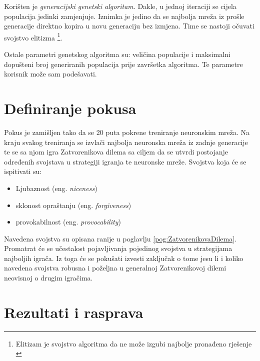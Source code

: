 \documentclass[zavrsnirad]{fer}
\begin{document}
		Korišten je \textit{generacijski genetski algoritam}. Dakle, u jednoj iteraciji se cijela populacija jedinki zamjenjuje. Iznimka je jedino da se najbolja mreža iz prošle generacije direktno kopira u novu generaciju bez izmjena. Time se nastoji očuvati svojstvo elitizma \footnote{Elitizam je svojstvo algoritma da ne može izgubi najbolje pronađeno rješenje \cite{skriptaEvolucijskoRacunarstvo}}. 
	
		Ostale parametri genetskog algoritma su: veličina populacije i maksimalni dopušteni broj generiranih populacija prije završetka algoritma. Te parametre korisnik može sam podešavati.
	
\chapter{Definiranje pokusa}
\label{pog:Pokus}

	Pokus je zamišljen tako da se 20 puta pokrene treniranje neuronskim mreža. Na kraju svakog treniranja se izvlači najbolja neuronska mreža iz zadnje generacije te se sa njom igra Zatvorenikova dilema sa ciljem da se utvrdi postojanje određenih svojstava u strategiji igranja te neuronske mreže. Svojstva koja će se ispitivati su:
	\begin{itemize}
		\item Ljubaznost (eng. \textit{niceness})
		\item sklonost opraštanju (eng. \textit{forgiveness})
		\item provokabilnost (eng. \textit{provocability})
	\end{itemize}
	
	Navedena svojstva su opisana ranije u poglavlju \ref{pog:ZatvorenikovaDilema}. Promatrat će se učestalost pojavljivanja pojedinog svojstva u strategijama najboljih igrača. Iz toga će se pokušati izvesti zaključak o tome jesu li i koliko navedena svojstva robusna i poželjna u generalnoj Zatvorenikovoj dilemi neovisnoj o drugim igračima.
	
	



\chapter{Rezultati i rasprava}
\label{pog:rezultati_i_rasprava}
\end{document}
